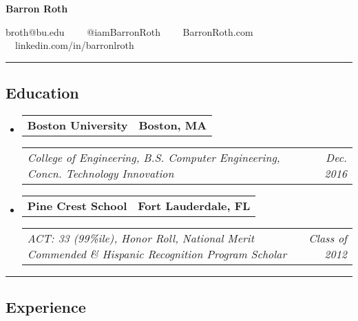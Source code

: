 \documentclass[10pt,letterpaper]{article}
\makeatletter
\newcommand{\headerrow}[2]
{\begin{tabular*}{\linewidth}{l@{\extracolsep{\fill}}r}
	#1 &
	#2 \\
\end{tabular*}}
\makeatother
\begin{document}
\begin{center}
{\LARGE \textbf{Barron Roth}}

broth@bu.edu\ \ \textbullet
\ \ @iamBarronRoth\ \ \textbullet
\ \ BarronRoth.com\ \ \textbullet
\ \ linkedin.com/in/barronlroth

\end{center}

\hrule
\vspace{-0.9em}

\subsection*{Education}

\begin{itemize}
	\parskip=0.001em
	
	\item 
	\headerrow
	{\textbf{Boston University}}
	{\textbf{Boston, MA}}
	\headerrow
	{\emph{College of Engineering, B.S. Computer Engineering, Concn. Technology Innovation}}
	{\emph{Dec. 2016}}
	
	\item 
	\headerrow
	{\textbf{Pine Crest School}}
	{\textbf{Fort Lauderdale, FL}}
	\headerrow
	{\emph{ACT: 33 (99\%ile), Honor Roll, National Merit Commended \& Hispanic Recognition Program Scholar}}
	{\emph{Class of 2012}}
	
\end{itemize}


\hrule
\vspace{-0.9em}


\subsection*{Experience}
\end{document}
